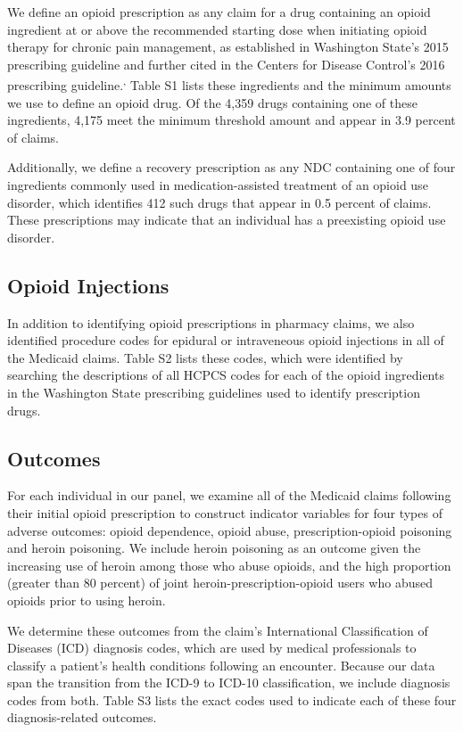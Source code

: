 \documentclass[10pt, letter]{article}
\begin{document}
We define an opioid prescription as any claim for a drug containing an opioid ingredient at or above the recommended starting dose when initiating opioid therapy for chronic pain management, as established in Washington State's 2015 prescribing guideline and further cited in the Centers for Disease Control's 2016 prescribing guideline.\textsuperscript{,} Table S1 lists these ingredients and the minimum amounts we use to define an opioid drug. Of the 4,359 drugs containing one of these ingredients, 4,175 meet the minimum threshold amount and appear in 3.9 percent of claims.

Additionally, we define a recovery prescription as any NDC containing one of four ingredients commonly used in medication-assisted treatment of an opioid use disorder, which identifies 412 such drugs that appear in 0.5 percent of claims. These prescriptions may indicate that an individual has a preexisting opioid use disorder.

\subsection{Opioid Injections}

In addition to identifying opioid prescriptions in pharmacy claims, we also identified procedure codes for epidural or intraveneous opioid injections in all of the Medicaid claims. Table S2 lists these codes, which were identified by searching the descriptions of all HCPCS codes for each of the opioid ingredients in the Washington State prescribing guidelines used to identify prescription drugs.

\subsection{Outcomes}

For each individual in our panel, we examine all of the Medicaid claims following their initial opioid prescription to construct indicator variables for four types of adverse outcomes: opioid dependence, opioid abuse, prescription-opioid poisoning and heroin poisoning. We include heroin poisoning as an outcome given the increasing use of heroin among those who abuse opioids, and the high proportion (greater than 80 percent) of joint heroin-prescription-opioid users who abused opioids prior to using heroin.

We determine these outcomes from the claim's International Classification of Diseases (ICD) diagnosis codes, which are used by medical professionals to classify a patient's health conditions following an encounter. Because our data span the transition from the ICD-9 to ICD-10 classification, we include diagnosis codes from both. Table S3 lists the exact codes used to indicate each of these four diagnosis-related outcomes. 
\end{document}
